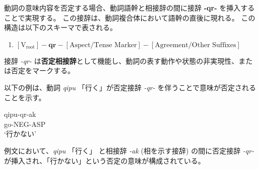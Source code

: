 動詞の意味内容を否定する場合、動詞語幹と相接辞の間に接辞 \textbf{-qr-} を挿入することで実現する。
この接辞は、動詞複合体において語幹の直後に現れる。
この構造は以下のスキーマで表される。
%
\begin{enumerate}
    \item $[ \text{V}_{\text{root}} ] - \textbf{qr} - [ \text{Aspect/Tense Marker} ] - [ \text{Agreement/Other Suffixes} ]$
\end{enumerate}
%
接辞 \textit{-qr-} は\textbf{否定相接辞}として機能し、動詞の表す動作や状態の非実現性、または否定をマークする。

以下の例は、動詞 \textit{qipu} 「行く」が否定接辞 \textit{-qr-} を伴うことで意味が否定されることを示す。

\begin{exe}
\ex \gll qipu-qr-ak \\
        go-NEG-ASP \\
        \glt `行かない'
\end{exe}
%
例文において、\textit{qipu} 「行く」 と相接辞 \textit{-ak} (相を示す接辞) の間に否定接辞 \textit{-qr-} が挿入され、「行かない」という否定の意味が構成されている。

